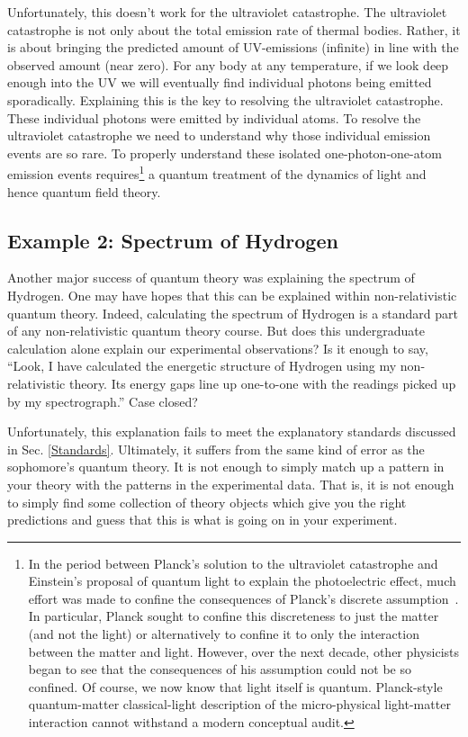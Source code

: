 \documentclass[prd,twocolumn,superscriptaddress,floatfix,amsmath,amssymb,amsfonts,nofootinbib]{revtex4-2}
\begin{document}
Unfortunately, this doesn't work for the ultraviolet catastrophe. The ultraviolet catastrophe is not only about the total emission rate of thermal bodies. Rather, it is about bringing the predicted amount of UV-emissions (infinite) in line with the observed amount (near zero). For any body at any temperature, if we look deep enough into the UV we will eventually find individual photons being emitted sporadically. Explaining this is the key to resolving the ultraviolet catastrophe. These individual photons were emitted by individual atoms. To resolve the ultraviolet catastrophe we need to understand why those individual emission events are so rare. To properly understand these isolated one-photon-one-atom emission events requires\footnote{In the period between Planck's solution to the ultraviolet catastrophe and Einstein's proposal of quantum light to explain the photoelectric effect, much effort was made to confine the consequences of Planck's discrete assumption~\cite{PlanckHistory}. In particular, Planck sought to confine this discreteness to just the matter (and not the light) or alternatively to confine it to only the interaction between the matter and light. However, over the next decade, other physicists began to see that the consequences of his assumption could not be so confined. Of course, we now know that light itself is quantum. Planck-style quantum-matter classical-light description of the micro-physical light-matter interaction cannot withstand a modern conceptual audit.} a quantum treatment of the dynamics of light and hence quantum field theory.

\subsection{Example 2: Spectrum of Hydrogen}
Another major success of quantum theory was explaining the spectrum of Hydrogen. One may have hopes that this can be explained within non-relativistic quantum theory. Indeed, calculating the spectrum of Hydrogen is a standard part of any non-relativistic quantum theory course. But does this undergraduate calculation alone explain our experimental observations? Is it enough to say, ``Look, I have calculated the energetic structure of Hydrogen using my non-relativistic theory. Its energy gaps line up one-to-one with the readings picked up by my spectrograph.'' Case closed?

Unfortunately, this explanation fails to meet the explanatory standards discussed in Sec. \ref{Standards}. Ultimately, it suffers from the same kind of error as the sophomore's quantum theory. It is not enough to simply match up a pattern in your theory with the patterns in the experimental data. That is, it is not enough to simply find some collection of theory objects which give you the right predictions and guess that this is what is going on in your experiment.
\end{document}
